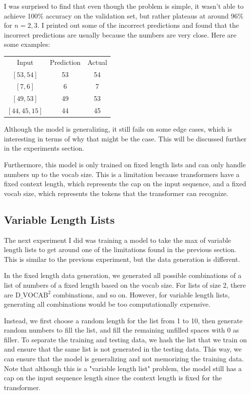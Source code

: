 \documentclass{article}
\begin{document}
I was surprised to find that even though the problem is simple, it wasn't able to achieve 100$\%$ accuracy on the validation set, but rather plateaus at around 96$\%$ for $n = 2, 3$. I printed out some of the incorrect predictions and found that the incorrect predictions are usually because the numbers are very close. Here are some examples:

\begin{center}
    \begin{tabular}{c c c}
        Input & Prediction & Actual \\
        $[53, 54]$ & 53 & 54 \\
        $[7, 6]$ & 6 & 7 \\
        $[49, 53]$ & 49 & 53 \\
        $[44, 45, 15]$ & 44 & 45 \\

    \end{tabular}
\end{center}

Although the model is generalizing, it still fails on some edge cases, which is interesting in terms of why that might be the case. This will be discussed further in the experiments section.

Furthermore, this model is only trained on fixed length lists and can only handle numbers up to the vocab size. This is a limitation because transformers have a fixed context length, which represents the cap on the input sequence, and a fixed vocab size, which represents the tokens that the transformer can recognize. 

\subsection{Variable Length Lists}

The next experiment I did was training a model to take the max of variable length lists to get around one of the limitations found in the previous section. This is similar to the previous experiment, but the data generation is different.

In the fixed length data generation, we generated all possible combinations of a list of numbers of a fixed length based on the vocab size. For lists of size 2, there are $\text{D$\_$VOCAB}^2$ combinations, and so on. However, for variable length lists, generating all combinations would be too computationally expensive. 

Instead, we first choose a random length for the list from 1 to 10, then generate random numbers to fill the list, and fill the remaining unfilled spaces with 0 as filler. To separate the training and testing data, we hash the list that we train on and ensure that the same list is not generated in the testing data. This way, we can ensure that the model is generalizing and not memorizing the training data. Note that although this is a "variable length list" problem, the model still has a cap on the input sequence length since the context length is fixed for the transformer.
\end{document}
